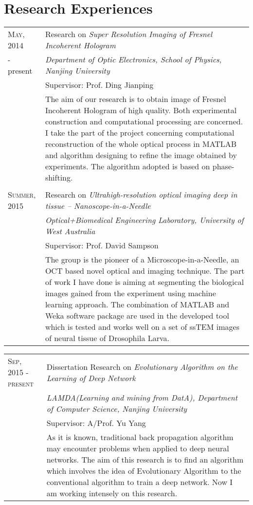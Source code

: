 \documentclass[ENG]{Sketch}
\begin{document}
\section{Research Experiences}
\begin{tabular}{p{1.8cm}|p{12cm}}

\textsc{May, 2014} & Research on \textit{Super Resolution Imaging of Fresnel Incoherent Hologram} \\
- present&\emph{Department of Optic Electronics, School of Physics, Nanjing University}\\
& Supervisor: Prof. Ding Jianping \\
&\footnotesize{The aim of our research is to obtain image of Fresnel Incoherent Hologram of high quality. Both experimental construction and computational processing are concerned. I take the part of the project concerning computational reconstruction of the whole optical process in MATLAB and algorithm designing to refine the image obtained by experiments. The algorithm adopted is based on phase-shifting.}\\

\multicolumn{2}{c}{} \\

\textsc{Summer, 2015} & Research on \textit{Ultrahigh-resolution optical imaging deep in tissue – Nanoscope-in-a-Needle} \\
&\emph{Optical+Biomedical Engineering Laboratory, University of West Australia}\\
& Supervisor: Prof. David Sampson \\
&\footnotesize{The group is the pioneer of a Microscope-in-a-Needle, an OCT based novel optical and imaging technique. The part of work I have done is aiming at segmenting the biological images gained from the experiment using machine learning approach. The combination of MATLAB and Weka software package are used in the developed tool which is tested and works well on a set of ssTEM images of neural tissue of Drosophila Larva.}\\

\end{tabular}

\begin{tabular}{p{1.8cm}|p{12cm}}

\textsc{Sep, 2015 - present} & Dissertation Research on \textit{Evolutionary Algorithm on the Learning of Deep Network}\\
&\emph{LAMDA(Learning and mining from DatA), Department of Computer Science, Nanjing University}\\
& Supervisor: A/Prof. Yu Yang \\
&\footnotesize{As it is known, traditional back propagation algorithm may encounter problems when applied to deep neural networks. The aim of this research is to find an algorithm which involves the idea of Evolutionary Algorithm to the conventional algorithm to train a deep network. Now I am working intensely on this research.}\\

\end{tabular}
\end{document}
